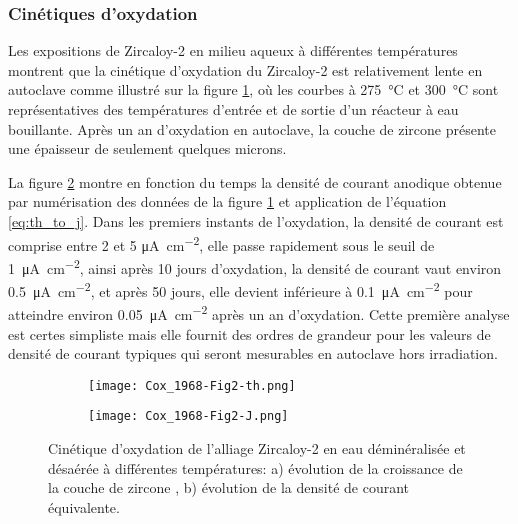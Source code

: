 \begin{refsection}
    \subsubsection{Cinétiques d'oxydation}\label{subsubsec:oxidation_kinetics}
    
    Les expositions de Zircaloy-2 en milieu aqueux à différentes températures montrent que la cinétique d'oxydation du Zircaloy-2 est
    relativement lente en autoclave comme illustré sur la figure \ref{fig:Zy2_Kinetics_vs_T}, où les courbes à
    \SI{275}{\degreeCelsius} et \SI{300}{\degreeCelsius} sont représentatives des températures d'entrée et de sortie d'un
    réacteur à eau bouillante. Après un an d'oxydation en
    autoclave, la couche de zircone présente une épaisseur de seulement quelques microns. 

    La figure \ref{fig:Zy2_Kinetics_vs_T_J} montre en fonction du temps la densité de courant anodique obtenue par
    numérisation des données de
    la figure \ref{fig:Zy2_Kinetics_vs_T} et application de l'équation \ref{eq:th_to_j}. Dans les premiers instants de
    l'oxydation, la densité de courant est comprise entre 2 et 5 \si{\micro\ampere\per\square\centi\meter}, elle passe 
    rapidement sous le seuil de \SI{1}{\micro\ampere\per\square\centi\meter}, ainsi
    après 10 jours d'oxydation, la densité de courant vaut environ \SI{0.5}{\micro\ampere\per\square\centi\meter}, et après 50 jours,
    elle devient inférieure à \SI{0.1}{\micro\ampere\per\square\centi\meter} pour atteindre
    environ \SI{0.05}{\micro\ampere\per\square\centi\meter} après un an d'oxydation. Cette première analyse est certes
    simpliste mais elle fournit des ordres de grandeur pour les valeurs de densité de courant typiques qui seront
    mesurables en autoclave hors irradiation.

    \begin{figure}[H]
        \centering
        \begin{subfigure}[b]{0.65\textwidth}
            \texttt{[image: Cox\_1968-Fig2-th.png]}
            \caption{}
            \label{fig:Zy2_Kinetics_vs_T}
        \end{subfigure}
        \begin{subfigure}[b]{0.65\textwidth}
            \texttt{[image: Cox\_1968-Fig2-J.png]}
            \caption{}
            \label{fig:Zy2_Kinetics_vs_T_J}
        \end{subfigure}
        \caption[Cinétique d'oxydation de l'alliage Zircaloy-2 en eau déminéralisée et désaérée à différentes
        températures.]{Cinétique d'oxydation de l'alliage Zircaloy-2 en eau déminéralisée et désaérée à différentes
        températures:
        a) évolution de la croissance de la couche de zircone \citep{Cox1968-1}, b) évolution de la densité de courant équivalente.}
        \label{fig:ch1_Zy2_Kinetics_th_J}
    \end{figure}



\end{refsection}
